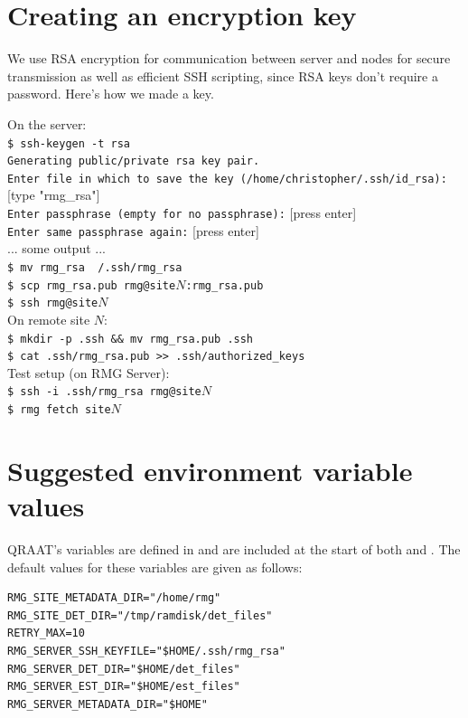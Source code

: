 \documentclass[letter]{article}
\begin{document}
\begin{appendices}
\section{Creating an encryption key}
We use RSA encryption for communication between server and nodes for secure transmission
as well as efficient SSH scripting, since RSA keys don't require a password. 
Here's how we made a key.

On the server:\\
\texttt{\$ ssh-keygen -t rsa}\\
\texttt{Generating public/private rsa key pair.}\\
\texttt{Enter file in which to save the key (/home/christopher/.ssh/id\_rsa):} [type "rmg\_rsa"]\\
\texttt{Enter passphrase (empty for no passphrase):} [press enter]\\
\texttt{Enter same passphrase again:} [press enter]\\
   ... some output ... \\
\texttt{\$ mv rmg\_rsa ~/.ssh/rmg\_rsa}\\
\texttt{\$ scp rmg\_rsa.pub rmg@site}$N$\texttt{:rmg\_rsa.pub}\\
\texttt{\$ ssh rmg@site}$N$\\

On remote site $N$:\\
\texttt{\$ mkdir -p .ssh \&\& mv rmg\_rsa.pub .ssh}\\
\texttt{\$ cat .ssh/rmg\_rsa.pub >> .ssh/authorized\_keys}\\

Test setup (on RMG Server):\\
\texttt{\$ ssh -i .ssh/rmg\_rsa rmg@site}$N$\\
\texttt{\$ rmg fetch site}$N$\\

\section{Suggested environment variable values}
QRAAT's variables are defined in  and are included at the start of both 
 and . The default values for these variables are given as 
follows: 

\begin{verbatim}
RMG_SITE_METADATA_DIR="/home/rmg"
RMG_SITE_DET_DIR="/tmp/ramdisk/det_files"
RETRY_MAX=10
RMG_SERVER_SSH_KEYFILE="$HOME/.ssh/rmg_rsa"
RMG_SERVER_DET_DIR="$HOME/det_files"
RMG_SERVER_EST_DIR="$HOME/est_files"
RMG_SERVER_METADATA_DIR="$HOME"
\end{verbatim}

\end{appendices}
\end{document}
